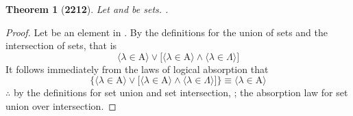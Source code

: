 \documentclass[preview]{standalone}
\newtheorem{theorem}{Theorem}
\begin{document}
\begin{theorem}[\textbf{2212}]
    Let  and \bm{$\Lambda$} be sets. 
    .
\end{theorem}
\begin{proof}
    Let \bm{$\lambda$} be an element in 
    . 
    By the definitions for the union of sets and the intersection of sets, that is
    \begin{equation*}
        \Big \langle \lambda \in \mathrm{A} \Big \rangle 
            \lor 
        \bigg[
            \Big \langle \lambda \in \mathrm{A} \Big \rangle 
                \land 
            \Big \langle \lambda \in \Lambda \Big \rangle
        \bigg]
    \end{equation*}
    It follows immediately from the laws of logical absorption that
    \begin{equation*}
        \Bigg\{
            \Big \langle \lambda \in \mathrm{A} \Big \rangle 
                \lor 
            \bigg[
                \Big \langle \lambda \in \mathrm{A} \Big \rangle 
                    \land 
                \Big \langle \lambda \in \Lambda \Big \rangle
            \bigg]
        \Bigg\}
            \equiv 
        \bigg \langle \lambda \in \mathrm{A} \bigg \rangle 
    \end{equation*}
    $\therefore$ by the definitions for set union and set intersection, 
    ; 
    the absorption law for set union over intersection.
\end{proof}
\end{document}
